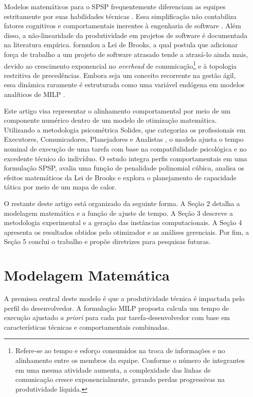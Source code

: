 \documentclass[a4paper,11pt]{article}
\begin{document}
Modelos matemáticos para o SPSP frequentemente diferenciam as equipes estritamente por suas 
habilidades técnicas \citep{alba2007, chicano2011, pritsker1969}. Essa 
simplificação não contabiliza fatores cognitivos e comportamentais inerentes 
à engenharia de software \citep{demarco1987}. Além disso, a não-linearidade da produtividade em projetos de software é 
documentada na literatura empírica. \citet{brooks1975} formulou a Lei de Brooks, 
a qual postula que adicionar força de trabalho a um projeto de software atrasado 
tende a atrasá-lo ainda mais, devido ao crescimento exponencial no \textit{overhead} 
de comunicação\footnote{Refere-se ao tempo e esforço consumidos na troca de
informações e no alinhamento entre os membros da equipe. Conforme o número de
integrantes em uma mesma atividade aumenta, a complexidade das linhas de comunicação
cresce exponencialmente, gerando perdas progressivas na produtividade líquida.} e à
topologia restritiva de precedências. Embora seja um conceito 
recorrente na gestão ágil, essa dinâmica raramente é estruturada como uma variável 
endógena em modelos analíticos de MILP \citep{ryan2013, acuna2006}.

Este artigo visa representar o alinhamento comportamental por meio de um 
componente numérico dentro de um modelo de otimização matemática. Utilizando 
a metodologia psicométrica Solides, que categoriza os profissionais em Executores, 
Comunicadores, Planejadores e Analistas \citep{costa2018}, o modelo ajusta o 
tempo nominal de execução de uma tarefa com base na compatibilidade psicológica 
e no excedente técnico do indivíduo. O estudo integra perfis comportamentais 
em uma formulação SPSP, avalia uma função de penalidade polinomial cúbica, 
analisa os efeitos matemáticos da Lei de Brooks e explora o planejamento de 
capacidade tática por meio de um mapa de calor.

O restante deste artigo está organizado da seguinte forma. A Seção 2 detalha a
modelagem matemática e a função de ajuste de tempo. A Seção 3 descreve a metodologia
experimental e a geração das instâncias computacionais. A Seção 4 apresenta os
resultados obtidos pelo otimizador e as análises gerenciais. Por fim, a Seção 5
conclui o trabalho e propõe diretrizes para pesquisas futuras.

\section{Modelagem Matemática}

A premissa central deste modelo é que a produtividade técnica é impactada pelo 
perfil do desenvolvedor. A formulação MILP proposta calcula um tempo de execução 
ajustado \textit{a priori} para cada par tarefa-desenvolvedor com base em 
características técnicas e comportamentais combinadas.
\end{document}

